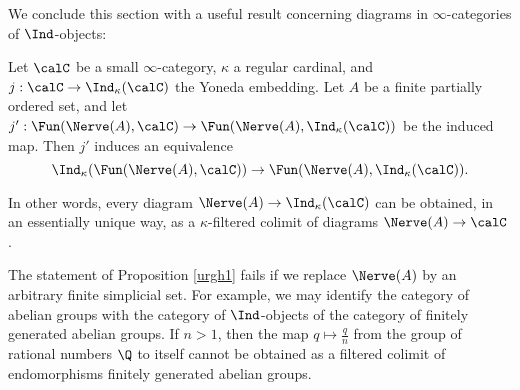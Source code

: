 We conclude this section with a useful result concerning diagrams in $\infty$-categories of $\Ind$-objects:

\begin{proposition}\label{urgh1}
Let $\calC$ be a small $\infty$-category, $\kappa$ a regular cardinal, and 
$j: \calC \rightarrow \Ind_{\kappa}(\calC)$ the Yoneda embedding. Let $A$ be a finite partially ordered set, and let $j': \Fun( \Nerve(A), \calC) \rightarrow \Fun( \Nerve(A), \Ind_{\kappa}(\calC))$ be the induced map. Then $j'$ induces an equivalence
$$ \Ind_{\kappa}( \Fun(\Nerve(A), \calC) ) \rightarrow \Fun( \Nerve(A), \Ind_{\kappa}(\calC)).$$ 
\end{proposition}

In other words, every diagram $\Nerve(A) \rightarrow \Ind_{\kappa}(\calC)$ can be obtained, in
an essentially unique way, as a $\kappa$-filtered colimit of diagrams $\Nerve(A) \rightarrow \calC$.

\begin{warning}
The statement of Proposition \ref{urgh1} fails if we replace $\Nerve(A)$ by an arbitrary finite simplicial set. For example, we may identify the category of abelian groups with the category of $\Ind$-objects of the category of finitely generated abelian groups. If $n > 1$, then the map $q \mapsto \frac{q}{n}$ from the group of rational numbers $\Q$ to itself cannot be obtained as a filtered colimit of endomorphisms finitely generated abelian groups. 
\end{warning}

